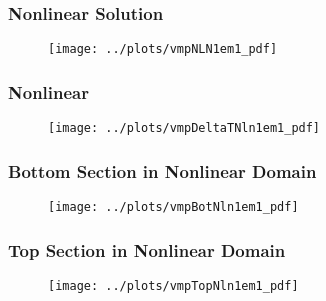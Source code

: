 \documentclass[compress,xcolor=table]{beamer}
\begin{document}
\begin{frame}
\frametitle{Nonlinear Solution}

\begin{figure}[h!t]
\centering
\texttt{[image: ../plots/vmpNLN1em1\_pdf]}
\end{figure}

\end{frame}
\begin{frame}
\frametitle{Nonlinear \dtmax{}}

\begin{figure}[h!t]
\centering
\texttt{[image: ../plots/vmpDeltaTNln1em1\_pdf]}
\end{figure}

\end{frame}
\begin{frame}
\frametitle{Bottom Section in Nonlinear Domain}

\begin{figure}[h!t]
\centering
\texttt{[image: ../plots/vmpBotNln1em1\_pdf]}
\end{figure}

\end{frame}
\begin{frame}
\frametitle{Top Section in Nonlinear Domain}

\begin{figure}[h!t]
\centering
\texttt{[image: ../plots/vmpTopNln1em1\_pdf]}
\end{figure}

\end{frame}
\end{document}
